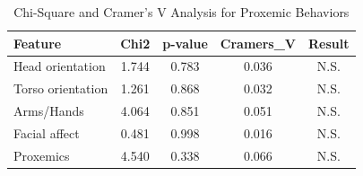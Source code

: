 \begin{table}
\caption{Chi-Square and Cramer's V Analysis for Proxemic Behaviors}
\label{tab:proxemics_stats}
\begin{tabular}{lcccc}
\toprule
Feature & Chi2 & p-value & Cramers\_V & Result \\
\midrule
Head orientation & 1.744 & 0.783 & 0.036 & N.S. \\
Torso orientation & 1.261 & 0.868 & 0.032 & N.S. \\
Arms/Hands & 4.064 & 0.851 & 0.051 & N.S. \\
Facial affect & 0.481 & 0.998 & 0.016 & N.S. \\
Proxemics & 4.540 & 0.338 & 0.066 & N.S. \\
\bottomrule
\end{tabular}
\end{table}
